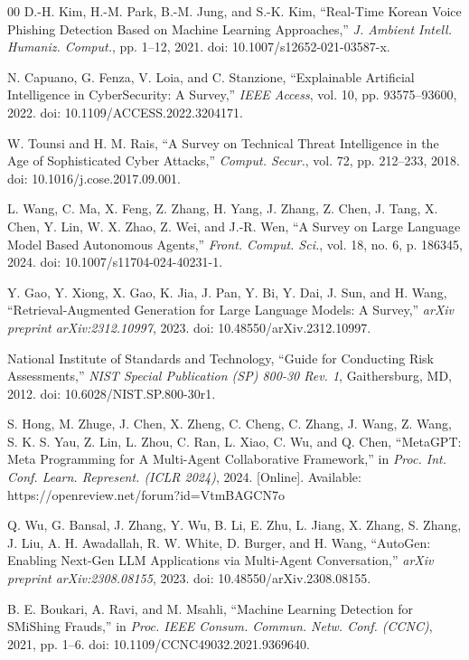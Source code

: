 \documentclass[conference]{IEEEtran}
\begin{document}
\begin{thebibliography}{00}
D.-H. Kim, H.-M. Park, B.-M. Jung, and S.-K. Kim, ``Real-Time Korean Voice Phishing Detection Based on Machine Learning Approaches,'' \textit{J. Ambient Intell. Humaniz. Comput.}, pp. 1--12, 2021. doi: 10.1007/s12652-021-03587-x.

N. Capuano, G. Fenza, V. Loia, and C. Stanzione, ``Explainable Artificial Intelligence in CyberSecurity: A Survey,'' \textit{IEEE Access}, vol. 10, pp. 93575--93600, 2022. doi: 10.1109/ACCESS.2022.3204171.

W. Tounsi and H. M. Rais, ``A Survey on Technical Threat Intelligence in the Age of Sophisticated Cyber Attacks,'' \textit{Comput. Secur.}, vol. 72, pp. 212--233, 2018. doi: 10.1016/j.cose.2017.09.001.

L. Wang, C. Ma, X. Feng, Z. Zhang, H. Yang, J. Zhang, Z. Chen, J. Tang, X. Chen, Y. Lin, W. X. Zhao, Z. Wei, and J.-R. Wen, ``A Survey on Large Language Model Based Autonomous Agents,'' \textit{Front. Comput. Sci.}, vol. 18, no. 6, p. 186345, 2024. doi: 10.1007/s11704-024-40231-1.

Y. Gao, Y. Xiong, X. Gao, K. Jia, J. Pan, Y. Bi, Y. Dai, J. Sun, and H. Wang, ``Retrieval-Augmented Generation for Large Language Models: A Survey,'' \textit{arXiv preprint arXiv:2312.10997}, 2023. doi: 10.48550/arXiv.2312.10997.

National Institute of Standards and Technology, ``Guide for Conducting Risk Assessments,'' \textit{NIST Special Publication (SP) 800-30 Rev. 1}, Gaithersburg, MD, 2012. doi: 10.6028/NIST.SP.800-30r1.

S. Hong, M. Zhuge, J. Chen, X. Zheng, C. Cheng, C. Zhang, J. Wang, Z. Wang, S. K. S. Yau, Z. Lin, L. Zhou, C. Ran, L. Xiao, C. Wu, and Q. Chen, ``MetaGPT: Meta Programming for A Multi-Agent Collaborative Framework,'' in \textit{Proc. Int. Conf. Learn. Represent. (ICLR 2024)}, 2024. [Online]. Available: https://openreview.net/forum?id=VtmBAGCN7o

Q. Wu, G. Bansal, J. Zhang, Y. Wu, B. Li, E. Zhu, L. Jiang, X. Zhang, S. Zhang, J. Liu, A. H. Awadallah, R. W. White, D. Burger, and H. Wang, ``AutoGen: Enabling Next-Gen LLM Applications via Multi-Agent Conversation,'' \textit{arXiv preprint arXiv:2308.08155}, 2023. doi: 10.48550/arXiv.2308.08155.

B. E. Boukari, A. Ravi, and M. Msahli, ``Machine Learning Detection for SMiShing Frauds,'' in \textit{Proc. IEEE Consum. Commun. Netw. Conf. (CCNC)}, 2021, pp. 1--6. doi: 10.1109/CCNC49032.2021.9369640.


\end{thebibliography}
\end{document}
